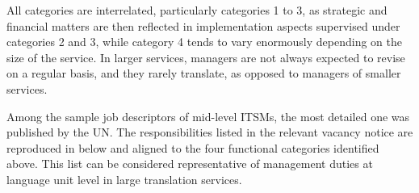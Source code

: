 \documentclass[output=paper]{langsci/langscibook}
\begin{document}
All categories are interrelated, particularly categories 1 to 3, as strategic and financial matters are then reflected in implementation aspects supervised under categories 2 and 3, while category 4 tends to vary enormously depending on the size of the service. In larger services, managers are not always expected to revise on a regular basis, and they rarely translate, as opposed to managers of smaller services. 



Among the sample job descriptors of mid-level ITSMs, the most detailed one was published by the UN. The responsibilities listed in the relevant vacancy notice are reproduced in  below and aligned to the four functional categories identified above. This list can be considered representative of management duties at language unit level in large translation services.
\end{document}
